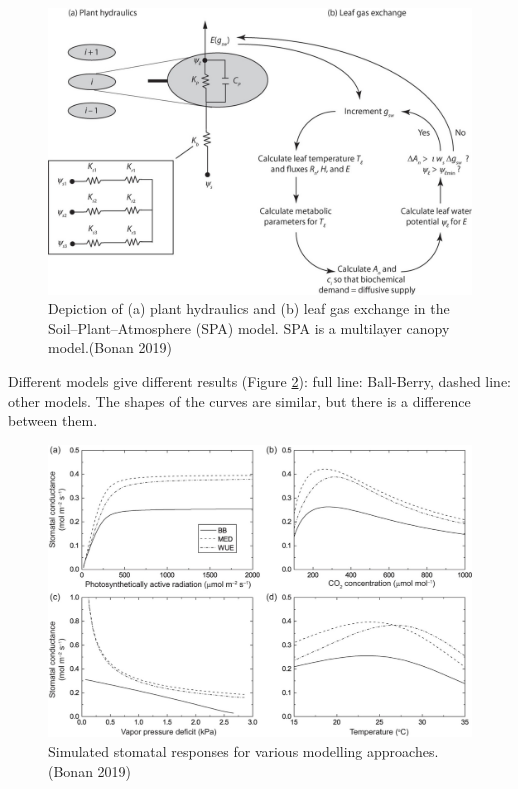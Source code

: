 \documentclass[12pt,oneside]{book}
\begin{document}
\begin{figure}

{\centering \includegraphics[width=0.8\linewidth]{figures/chap2/SPA} 

}

\caption{Depiction of (a) plant hydraulics and (b) leaf gas exchange in the Soil–Plant–Atmosphere (SPA) model. SPA is a multilayer canopy model.(Bonan 2019)}\label{fig:f219}
\end{figure}

Different models give different results (Figure \ref{fig:f220}): full
line: Ball-Berry, dashed line: other models. The shapes of the curves
are similar, but there is a difference between them.

\begin{figure}

{\centering \includegraphics[width=0.8\linewidth]{figures/chap2/modelling_approaches} 

}

\caption{Simulated stomatal responses for various modelling approaches. (Bonan 2019)}\label{fig:f220}
\end{figure}
\end{document}
